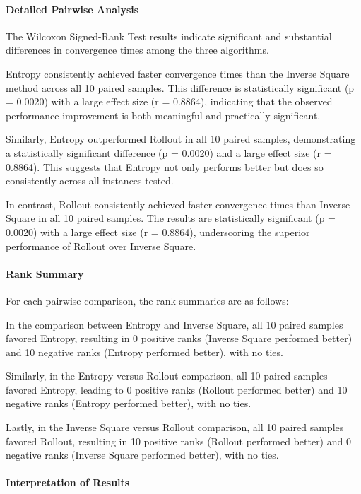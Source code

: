 \documentclass[../report.tex]{subfiles}
\begin{document}
    \paragraph{Detailed Pairwise Analysis}

    The Wilcoxon Signed-Rank Test results indicate significant and substantial differences in convergence times among the three algorithms.

    Entropy consistently achieved faster convergence times than the Inverse Square method across all 10 paired samples. This difference is statistically significant (p = 0.0020) with a large effect size (r = 0.8864), indicating that the observed performance improvement is both meaningful and practically significant.

    Similarly, Entropy outperformed Rollout in all 10 paired samples, demonstrating a statistically significant difference (p = 0.0020) and a large effect size (r = 0.8864). This suggests that Entropy not only performs better but does so consistently across all instances tested.

    In contrast, Rollout consistently achieved faster convergence times than Inverse Square in all 10 paired samples. The results are statistically significant (p = 0.0020) with a large effect size (r = 0.8864), underscoring the superior performance of Rollout over Inverse Square.

    \paragraph{Rank Summary}

    For each pairwise comparison, the rank summaries are as follows:

    In the comparison between Entropy and Inverse Square, all 10 paired samples favored Entropy, resulting in 0 positive ranks (Inverse Square performed better) and 10 negative ranks (Entropy performed better), with no ties.

    Similarly, in the Entropy versus Rollout comparison, all 10 paired samples favored Entropy, leading to 0 positive ranks (Rollout performed better) and 10 negative ranks (Entropy performed better), with no ties.

    Lastly, in the Inverse Square versus Rollout comparison, all 10 paired samples favored Rollout, resulting in 10 positive ranks (Rollout performed better) and 0 negative ranks (Inverse Square performed better), with no ties.

    \paragraph{Interpretation of Results}
\end{document}
